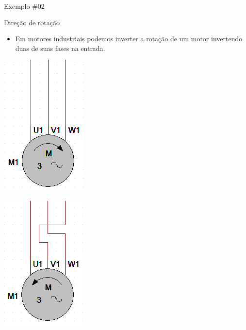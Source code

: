 \begin{frame}{Exemplo \#02}
\begin{block}{Direção de rotação}
\begin{itemize}
    \item Em motores industriais podemos inverter a rotação de um motor invertendo duas de suas fases na entrada.
\end{itemize}
\end{block}
\begin{minipage}{0.45\linewidth}
	\centering
	\includegraphics[width=0.6\linewidth]{Figuras/Ch07/fig6.jpg}
\end{minipage}
\hfill
\begin{minipage}{0.45\linewidth}
	\centering
	\includegraphics[width=0.65\linewidth]{Figuras/Ch07/fig7.jpg}
\end{minipage}
\end{frame}


